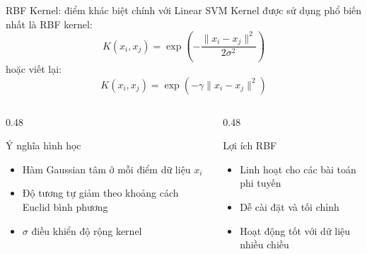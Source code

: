 \begin{frame}{RBF Kernel: điểm khác biệt chính với Linear SVM}
                  Kernel được sử dụng phổ biến nhất là RBF kernel:
                \[
                    K(x_i, x_j) = \exp\left(-\frac{\|x_i - x_j\|^2}{2\sigma^2}\right)
                \]
                hoặc viết lại:
                \[
                    K(x_i, x_j) = \exp\left(-\gamma \|x_i - x_j\|^2\right)
                \]
    \begin{columns}[T]
        \begin{column}{0.48\textwidth}
            \begin{alertblock}{Ý nghĩa hình học}
                \begin{itemize}
                    \item Hàm Gaussian tâm ở mỗi điểm dữ liệu $x_i$
                    \item Độ tương tự giảm theo khoảng cách Euclid bình phương
                    \item $\sigma$ điều khiển độ rộng kernel
                \end{itemize}
            \end{alertblock}
        \end{column}

        \begin{column}{0.48\textwidth}

            \begin{block}{Lợi ích RBF}
                \begin{itemize}
                    \item Linh hoạt cho các bài toán phi tuyến
                    \item Dễ cài đặt và tối chỉnh
                    \item Hoạt động tốt với dữ liệu nhiều chiều
                \end{itemize}
                \vspace{0.5cm}
            \end{block}
        \end{column}
    \end{columns}

    \hfill{\scriptsize \cite{duchesnay2021statsml}}
\end{frame}

